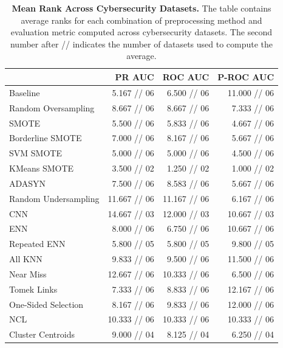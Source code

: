 \documentclass[conference]{IEEEtran}
\begin{document}
\begin{table}
    \centering
    \setlength\tabcolsep{2pt}

    \begin{tabularx}{\linewidth}{lRRR}
        & PR AUC & ROC AUC & P-ROC AUC \\
        \midrule
        Baseline & 5.167 // 06 & 6.500 // 06 & 11.000 // 06 \\
        Random Oversampling & 8.667 // 06 & 8.667 // 06 & 7.333 // 06 \\
        SMOTE & 5.500 // 06 & 5.833 // 06 & 4.667 // 06 \\
        Borderline SMOTE & 7.000 // 06 & 8.167 // 06 & 5.667 // 06 \\
        SVM SMOTE & 5.000 // 06 & 5.000 // 06 & 4.500 // 06 \\
        KMeans SMOTE & 3.500 // 02 & 1.250 // 02 & 1.000 // 02 \\
        ADASYN & 7.500 // 06 & 8.583 // 06 & 5.667 // 06 \\
        Random Undersampling & 11.667 // 06 & 11.167 // 06 & 6.167 // 06 \\
        CNN & 14.667 // 03 & 12.000 // 03 & 10.667 // 03 \\
        ENN & 8.000 // 06 & 6.750 // 06 & 10.667 // 06 \\
        Repeated ENN & 5.800 // 05 & 5.800 // 05 & 9.800 // 05 \\
        All KNN & 9.833 // 06 & 9.500 // 06 & 11.500 // 06 \\
        Near Miss & 12.667 // 06 & 10.333 // 06 & 6.500 // 06 \\
        Tomek Links & 7.333 // 06 & 8.833 // 06 & 12.167 // 06 \\
        One-Sided Selection & 8.167 // 06 & 9.833 // 06 & 12.000 // 06 \\
        NCL & 10.333 // 06 & 10.333 // 06 & 10.333 // 06 \\
        Cluster Centroids & 9.000 // 04 & 8.125 // 04 & 6.250 // 04 \\
    \end{tabularx}

    \vspace{4mm}

    \caption{
        \textbf{Mean Rank Across Cybersecurity Datasets.} The table contains average ranks for each
        combination of preprocessing method and evaluation metric computed across cybersecurity
        datasets. The second number after // indicates the number of datasets used to compute the
        average.
    }
    \label{table:mean-rank-cybersec}
\end{table}
\end{document}
